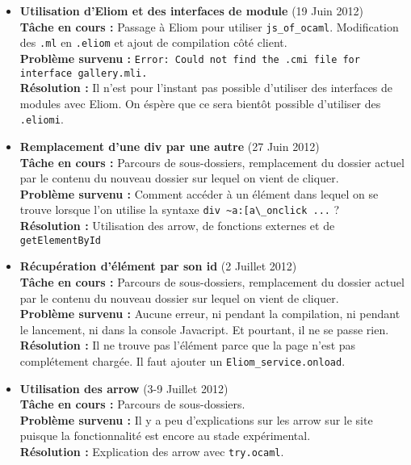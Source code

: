\documentclass{life-fr}
\begin{document}
\begin{itemize}
  \item \textbf{Utilisation d'Eliom et des interfaces de module} (19 Juin 2012)\\
    \textbf{Tâche en cours :} Passage à Eliom pour utiliser \texttt{js\_of\_ocaml}. Modification des \lstinline{.ml} en \lstinline{.eliom} et ajout de compilation côté client.\\
    \textbf{Problème survenu :} \texttt{Error: Could not find the .cmi file for interface gallery.mli.}\\
    \textbf{Résolution :} Il n'est pour l'instant pas possible d'utiliser des interfaces de modules avec Eliom. On éspère que ce sera bientôt possible d'utiliser des \lstinline{.eliomi}.

  \item \textbf{Remplacement d'une div par une autre} (27 Juin 2012)\\
    \textbf{Tâche en cours :} Parcours de sous-dossiers, remplacement du dossier actuel par le contenu du nouveau dossier sur lequel on vient de cliquer.\\
    \textbf{Problème survenu :} Comment accéder à un élément dans lequel on se trouve lorsque l'on utilise la syntaxe \lstinline{div ~a:[a\_onclick ...} ?\\
    \textbf{Résolution :} Utilisation des arrow, de fonctions externes et de \texttt{getElementById}

  \item \textbf{Récupération d'élément par son id} (2 Juillet 2012)\\
    \textbf{Tâche en cours :} Parcours de sous-dossiers, remplacement du dossier actuel par le contenu du nouveau dossier sur lequel on vient de cliquer.\\
    \textbf{Problème survenu :} Aucune erreur, ni pendant la compilation, ni pendant le lancement, ni dans la console Javacript. Et pourtant, il ne se passe rien.\\
    \textbf{Résolution :} Il ne trouve pas l'élément parce que la page n'est pas complétement chargée. Il faut ajouter un \texttt{Eliom\_service.onload}.

  \item \textbf{Utilisation des arrow} (3-9 Juillet 2012)\\
    \textbf{Tâche en cours :} Parcours de sous-dossiers.\\
    \textbf{Problème survenu :} Il y a peu d'explications sur les arrow sur le site puisque la fonctionnalité est encore au stade expérimental.\\
    \textbf{Résolution :} Explication des arrow avec \texttt{try.ocaml}.


\end{itemize}
\end{document}
